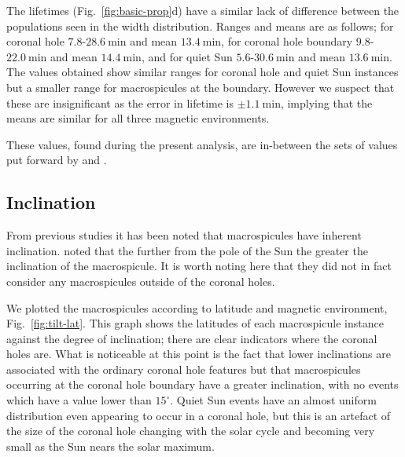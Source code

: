 The lifetimes (Fig.~\ref{fig:basic-prop}d) have a similar lack of difference between the populations seen in the width distribution. Ranges and means are as follows; for coronal hole $7.8$-$28.6\ \textrm{min}$ and mean $13.4\ \textrm{min}$, for coronal hole boundary $9.8$-$22.0\ \textrm{min}$ and mean $14.4\ \textrm{min}$, and for quiet Sun $5.6$-$30.6\ \textrm{min}$ and mean $13.6\ \textrm{min}$. The values obtained show similar ranges for coronal hole and quiet Sun instances but a smaller range for macrospicules at the boundary. However we suspect that these are insignificant as the error in lifetime is $\pm1.1\ \textrm{min}$, implying that the means are similar for all three magnetic environments.

These values, found during the present analysis, are in-between the sets of values put forward by \cite{Bohlin1975} and \cite{Dere89}.

\subsection{Inclination} 
From previous studies it has been noted that macrospicules have inherent inclination. \cite{Bohlin1975} noted that the further from the pole of the Sun the greater the inclination of the macrospicule. It is worth noting here that they did not in fact consider any macrospicules outside of the coronal holes. 

We plotted the macrospicules according to latitude and magnetic environment, Fig.~\ref{fig:tilt-lat}. This graph shows the latitudes of each macrospicule instance against the degree of inclination; there are clear indicators where the coronal holes are. What is noticeable at this point is the fact that lower inclinations are associated with the ordinary coronal hole features but that macrospicules occurring at the coronal hole boundary have a greater inclination, with no events which have a value lower than $15^{\circ}$. Quiet Sun events have an almost uniform distribution even appearing to occur in a coronal hole, but this is an artefact of the size of the coronal hole changing with the solar cycle and becoming very small as the Sun nears the solar maximum. 


